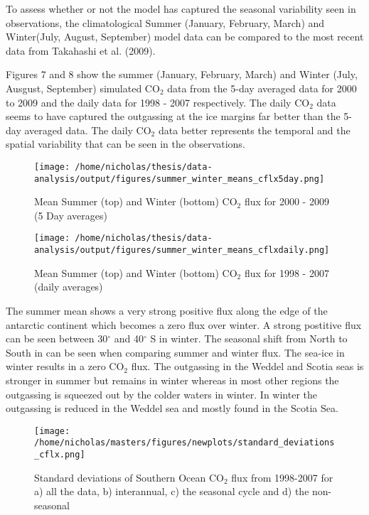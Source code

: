 \documentclass[11pt, a4paper]{article}
\numberwithin{figure}{section}
\numberwithin{table}{section}
\begin{document}
To assess whether or not the model has captured the seasonal variability seen
in observations, the climatological Summer (January, February, March) and 
Winter(July, August, September) model data can be compared to the most recent
data from Takahashi et al. (2009). 

Figures 7 and 8 show the summer (January, February, March) and Winter (July, Ausgust, September)
simulated CO$_2$ data from the 5-day averaged data for 2000 to 2009 and the daily data for
1998 - 2007 respectively. The daily CO$_2$ data seems to have captured the outgassing at the
ice margins far better than the 5-day averaged data. The daily CO$_2$ data better represents the 
temporal and the spatial variability that can be seen in the observations.

  \begin{figure}[h]
  \caption{Mean Summer (top) and Winter (bottom) CO$_2$ flux for 2000 - 2009 (5 Day averages)}
  \centering
  \texttt{[image: /home/nicholas/thesis/data-analysis/output/figures/summer\_winter\_means\_cflx5day.png]}
  \end{figure}
  
  \begin{figure}[h]
  \caption{Mean Summer (top) and Winter (bottom) CO$_2$ flux for 1998 - 2007 (daily averages)}
  \centering
  \texttt{[image: /home/nicholas/thesis/data-analysis/output/figures/summer\_winter\_means\_cflxdaily.png]}
  \end{figure}
  
The summer mean shows a very 
strong positive flux along the edge of the antarctic continent which becomes a 
zero flux over winter. A strong postitive flux can be seen between 30$^\circ$ 
and 40$^{\circ}$ S in winter. 
The seasonal shift from North to South in can be seen when comparing summer and 
winter flux.
The sea-ice in winter results in a zero CO$_2$ flux.
The outgassing in the Weddel and Scotia seas is stronger in summer but remains
in winter whereas in most other regions the outgassing is squeezed out by the 
colder waters in winter. In winter the outgassing is reduced in the Weddel sea 
and mostly found in the Scotia Sea.

  \begin{figure}[H]
    \caption{Standard deviations of Southern Ocean CO$_2$ flux from 1998-2007 for a) all the data, b) interannual,
		c) the seasonal cycle and d) the non-seasonal}
  \centering
    \texttt{[image: /home/nicholas/masters/figures/newplots/standard\_deviations\_cflx.png]}
  \end{figure}
\end{document}
